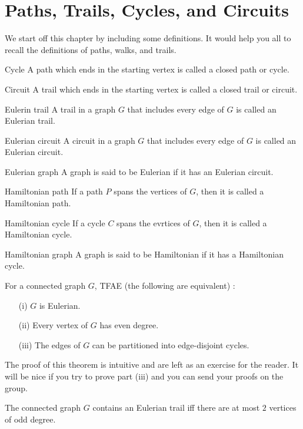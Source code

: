 \documentclass[../basic_graph_theory.tex]{subfiles}
\begin{document}
\chapter{Paths, Trails, Cycles, and Circuits}
\setcounter{chapter}{3} %
\setcounter{section}{0}
\setcounter{equation}{0}
\setcounter{figure}{0}

We start off this chapter by including some definitions. It would help you all to recall the definitions of paths, walks, and trails.

\begin{Def}{Cycle}{}
    A path which ends in the starting vertex is called a closed path or cycle.
\end{Def}
\begin{Def}{Circuit}{}
    A trail which ends in the starting vertex is called a closed trail or circuit.
\end{Def}
\begin{Def}{Eulerin trail}{}
    A trail in a graph $G$ that includes every edge of $G$ is called an Eulerian trail.
\end{Def}
\begin{Def}{Eulerian circuit}{}
    A circuit in a graph $G$ that includes every edge of $G$ is called an Eulerian circuit.
\end{Def}
\begin{Def}{Eulerian graph}{}
    A graph is said to be Eulerian if it has an Eulerian circuit.
\end{Def}
\begin{Def}{Hamiltonian path}{}
    If a path $P$ spans the vertices of $G$, then it is called a Hamiltonian path.
\end{Def}
\begin{Def}{Hamiltonian cycle}{}
    If a cycle $C$ spans the evrtices of $G$, then it is called a Hamiltonian cycle.
\end{Def}
\begin{Def}{Hamiltonian graph}{}
    A graph is said to be Hamiltonian if it has a Hamiltonian cycle.
\end{Def}

\begin{Thm}{}{}
    For a connected graph $G$, TFAE (the following are equivalent) :
    \begin{enumerate}
        \item[(i)] $G$ is Eulerian.
        \item[(ii)] Every vertex of $G$ has even degree.
        \item[(iii)] The edges of $G$ can be partitioned into edge-disjoint cycles.
    \end{enumerate}
\end{Thm}
The proof of this theorem is intuitive and are left as an exercise for the reader. It will be nice if you try to prove part (iii) and you can send your proofs on the group.
\begin{cor}
    The connected graph $G$ contains an Eulerian trail iff there are at most $2$ vertices of odd degree.
\end{cor}
\end{document}
